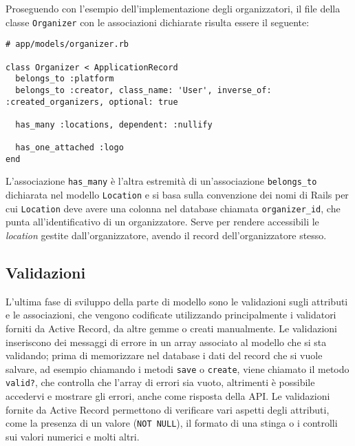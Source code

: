 Proseguendo con l'esempio dell'implementazione degli organizzatori, il file della classe \verb|Organizer| con le associazioni dichiarate risulta essere il seguente:
\begin{verbatim}
# app/models/organizer.rb

class Organizer < ApplicationRecord
  belongs_to :platform
  belongs_to :creator, class_name: 'User', inverse_of: :created_organizers, optional: true

  has_many :locations, dependent: :nullify

  has_one_attached :logo
end
\end{verbatim}
L'associazione \verb|has_many| è l'altra estremità di un'associazione \verb|belongs_to| dichiarata nel modello \verb|Location| e si basa sulla convenzione dei nomi di Rails per cui \verb|Location| deve avere una colonna nel database chiamata \verb|organizer_id|, che punta all'identificativo di un organizzatore. Serve per rendere accessibili le \emph{location} gestite dall'organizzatore, avendo il record dell'organizzatore stesso.

\subsection{Validazioni} \label{code:validates}

L'ultima fase di sviluppo della parte di modello sono le validazioni sugli attributi e le associazioni, che vengono codificate utilizzando principalmente i validatori forniti da Active Record, da altre gemme o creati manualmente. Le validazioni inseriscono dei messaggi di errore in un array associato al modello che si sta validando; prima di memorizzare nel database i dati del record che si vuole salvare, ad esempio chiamando i metodi \verb|save| o \verb|create|, viene chiamato il metodo \verb|valid?|, che controlla che l'array di errori sia vuoto, altrimenti è possibile accedervi e mostrare gli errori, anche come risposta della API. Le validazioni fornite da Active Record permettono di verificare vari aspetti degli attributi, come la presenza di un valore (\verb|NOT NULL|), il formato di una stinga o i controlli sui valori numerici e molti altri.

